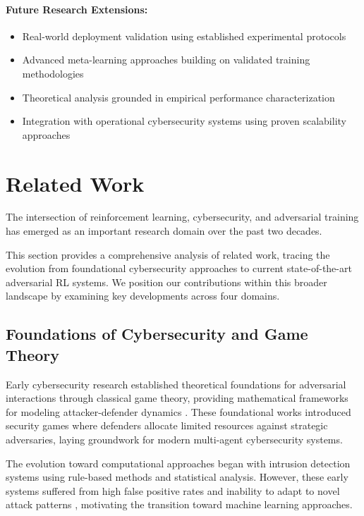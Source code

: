 \documentclass[12pt,oneside]{article}
\begin{document}
\paragraph{Future Research Extensions:}
\begin{itemize}
\item Real-world deployment validation using established experimental protocols
\item Advanced meta-learning approaches building on validated training methodologies
\item Theoretical analysis grounded in empirical performance characterization
\item Integration with operational cybersecurity systems using proven scalability approaches
\end{itemize}



\clearpage
\section{Related Work}

The intersection of reinforcement learning, cybersecurity, and adversarial training has emerged as an important research domain over the past two decades. 

This section provides a comprehensive analysis of related work, tracing the evolution from foundational cybersecurity approaches to current state-of-the-art adversarial RL systems. We position our contributions within this broader landscape by examining key developments across four domains.

\subsection{Foundations of Cybersecurity and Game Theory}

Early cybersecurity research established theoretical foundations for adversarial interactions through classical game theory, providing mathematical frameworks for modeling attacker-defender dynamics \citep{alpcan2010network}. These foundational works introduced security games where defenders allocate limited resources against strategic adversaries, laying groundwork for modern multi-agent cybersecurity systems.

The evolution toward computational approaches began with intrusion detection systems using rule-based methods and statistical analysis. However, these early systems suffered from high false positive rates and inability to adapt to novel attack patterns \citep{sommer2010outside}, motivating the transition toward machine learning approaches.
\end{document}
